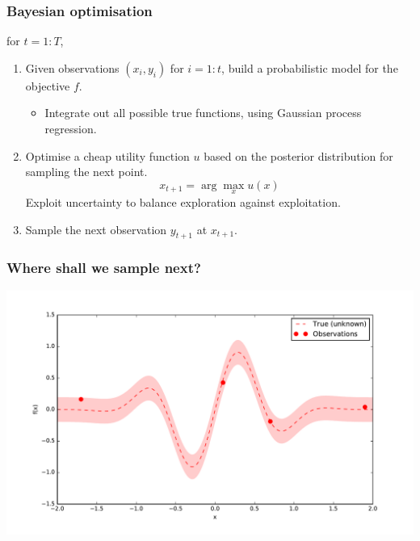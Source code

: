 \documentclass{beamer}
\begin{document}
\begin{frame}
    \frametitle{Bayesian optimisation}

    for $t=1:T$,
    \begin{enumerate}
        \item Given observations $(x_i, y_i)$ for $i=1:t$, build a probabilistic model for the objective $f$.
        \begin{itemize}
            \item Integrate out all possible true functions, using
            Gaussian process regression.
        \end{itemize}

        \item Optimise a cheap utility  function $u$ based on the posterior distribution for sampling the next point.
            $$x_{t+1} = \arg \max_x u(x)$$
            Exploit uncertainty to balance exploration against exploitation.

        \item Sample the next observation $y_{t+1}$ at $x_{t+1}$.
    \end{enumerate}

\end{frame}

\begin{frame}
    \frametitle{Where shall we sample next?}

    \begin{center}
        \includegraphics[width=\textwidth]{code/fig1.pdf}
    \end{center}
\end{frame}
\end{document}
